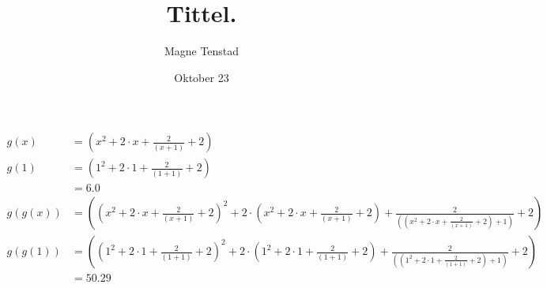 \title{Tittel.}
\author{Magne Tenstad}
\date{Oktober 23}


	\begin{align*}
		g\left(x\right)&= \left(x^2+2\cdot x+\frac{2}{\left(x+1\right)}+2\right)\\
		g\left(1\right)&= \left(1^2+2\cdot 1+\frac{2}{\left(1+1\right)}+2\right)\\
		&= 6.0\\
		g\left(g\left(x\right)\right)&= \left(\left(x^2+2\cdot x+\frac{2}{\left(x+1\right)}+2\right)^2+2\cdot \left(x^2+2\cdot x+\frac{2}{\left(x+1\right)}+2\right)+\frac{2}{\left(\left(x^2+2\cdot x+\frac{2}{\left(x+1\right)}+2\right)+1\right)}+2\right)\\
		g\left(g\left(1\right)\right)&= \left(\left(1^2+2\cdot 1+\frac{2}{\left(1+1\right)}+2\right)^2+2\cdot \left(1^2+2\cdot 1+\frac{2}{\left(1+1\right)}+2\right)+\frac{2}{\left(\left(1^2+2\cdot 1+\frac{2}{\left(1+1\right)}+2\right)+1\right)}+2\right)\\
		&= 50.29\\
	\end{align*}

